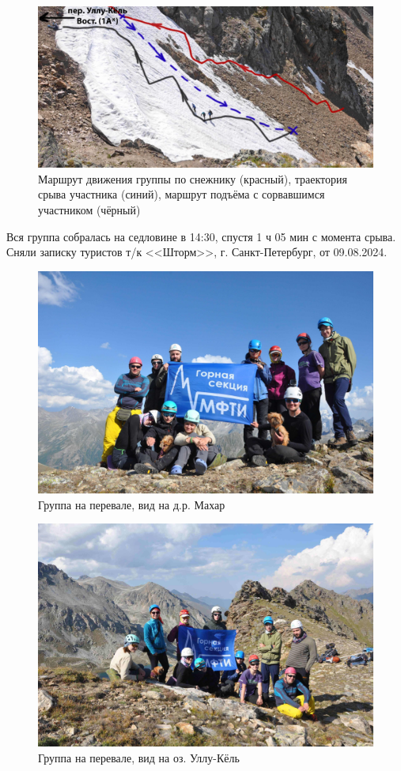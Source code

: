 \begin{figure}[h!]
	\centering
	\includegraphics[width=0.7\linewidth]{../pics/DSC_0946.jpg}
	\caption{Маршрут движения группы по снежнику (красный), траектория срыва участника (синий), маршрут подъёма с сорвавшимся участником (чёрный)}
	\label{fig:DSC_0946}
\end{figure}


Вся группа собралась на седловине в 14:30, спустя 1 ч 05 мин с момента срыва. Сняли записку туристов т/к <<Шторм>>, г. Санкт-Петербург, от 09.08.2024.


\begin{figure}[h!]
	\centering
	\includegraphics[width=0.7\linewidth]{../pics/DSC_0982}
	\caption{Группа на перевале, вид на д.р. Махар}
	\label{fig:DSC_0982}
\end{figure}

\begin{figure}[h!]
	\centering
	\includegraphics[width=0.7\linewidth]{../pics/DSC_0986}
	\caption{Группа на перевале, вид на оз. Уллу-Кёль}
	\label{fig:DSC_0986}
\end{figure}


